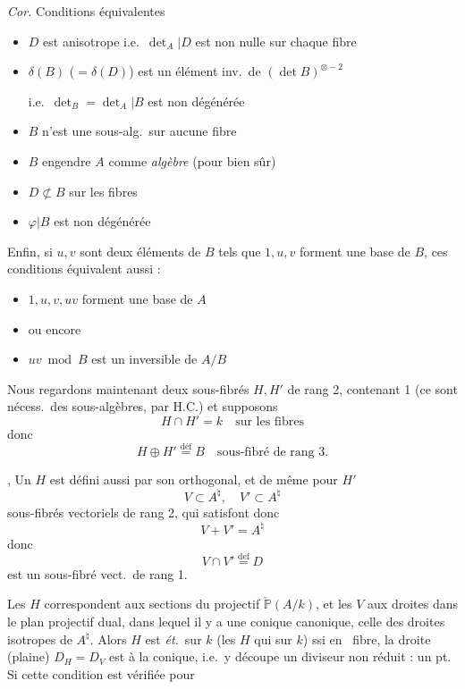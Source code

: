 \documentclass[11pt,a4paper]{article}
\begin{document}
\emph{Cor.} Conditions équivalentes
\begin{itemize}
\item[(i)] $D$ est anisotrope i.e.\ $\det_{A}|D$ est non nulle sur chaque fibre
\item[(ii)] $\delta(B)$ ($=\delta(D)$) est un élément inv.\ de $(\det B)^{\otimes -2}$ \struck{\ill{}}


i.e.\ $\det_{B}=\det_{A}|B$ est non dégénérée
\item[(iii)] $B$ n'est une sous-alg.\ sur aucune fibre
\item[(iv)] $B$  engendre $A$ comme \emph{algèbre} (pour \ill{} \ill{} bien sûr)
\item[(v)] $D\not\subset B$ sur les fibres
\item[(vi)] $\varphi|B$ est non dégénérée
\end{itemize}

Enfin, si $u,v$ sont deux éléments de $B$ tels que $1,u,v$ forment une base de $B$, ces conditions équivalent aussi :
\begin{itemize}
\item[(v)] $1,u,v,uv$ forment une base de $A$
\item[] ou encore\item[(v')] $uv \bmod B$ est un \struck{\ill{}}  inversible de $A/B$
\end{itemize}


Nous regardons maintenant deux sous-fibrés  $H,H'$ de rang 2, contenant 1 (ce sont nécess.\ des sous-algèbres, par H.C.) et supposons
\[
H\cap H'=k \quad\text{sur les fibres}
\]
donc
\[
H\oplus H'\overset{\mathrm{déf}}{=}B \quad\text{sous-fibré de rang 3.}
\]

\struck{\ill{}}, Un $H$  est défini aussi par son orthogonal, et de même pour $H'$
\[
V\subset A^{\natural},\quad V'\subset A^{\natural}
\]
sous-fibrés vectoriels de rang 2, qui satisfont donc
\[
V+V'=A^{\natural}
\]
donc
\[
V\cap V'\overset{\mathrm{def}}{=}D
\]
est un sous-fibré vect.\ de rang 1.


Les $H$ correspondent  \struck{\ill{}} aux sections  \struck{\ill{}}  du  projectif $\check{\mathbb{P}}(A/k)$, et les $V$ aux droites dans le plan projectif dual, dans lequel il y a une conique canonique, celle des droites isotropes de $A^{\natural}$. Alors $H$ est \emph{ét.}\ sur  $k$ (les $H$ qui  sur $k$) ssi en   \ fibre, la droite (plaine) $D_{H}=D_{V}$ est \struck{\ill{}}  à la conique, i.e.\ y découpe un diviseur  non réduit : un pt. Si cette condition est vérifiée pour
\end{document}
